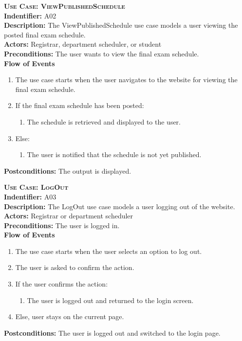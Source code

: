 \documentclass[11pt]{article}
\newcounter{id}
\newenvironment{usecase}{%
	\def\title##1{ {\large \bfseries  \scshape {Use Case:} ##1} \\ }
 	\def\id##1{{\bf Indentifier:} ##1\\}
	\def\des##1{ {\bf Description:} ##1\\}
	\def\actors##1{ {\bf Actors:} ##1\\}
    	\def\pre##1{ {\bf Preconditions:} ##1 \\} %
    	\def\flow##1{ {\bf Flow of Events} ##1}%
    	\newenvironment{ucenum}{%
        	\begin{enumerate}[nolistsep]\small}%
        	{\end{enumerate}}
	\def\post##1{ {\bf Postconditions:} ##1 \\}
}{\vspace{.05in}}
\begin{document}
\begin{usecase}
  \title{ViewPublishedSchedule}
  \id{A02}
  \des{The ViewPublishedSchedule use case models a user viewing the posted final exam schedule.}
  \actors{Registrar, department scheduler, or student}
  \pre{The user wants to view the final exam schedule.}
  \flow{}
  \begin{ucenum}
  \item The use case starts when the user navigates to the website for viewing the final exam schedule.
  \item If the final exam schedule has been posted:
    \begin{ucenum} \item The schedule is retrieved and displayed to the user. \end{ucenum}
  \item Else:
    \begin{ucenum} \item The user is notified that the schedule is not yet published. \end{ucenum}
  \end{ucenum}
  \post{The output is displayed.}
\end{usecase}

\begin{usecase}
  \title{LogOut}
  \id{A03}
  \des{The LogOut use case models a user logging out of the website.}
  \actors{Registrar or department scheduler}
  \pre{The user is logged in.}
  \flow{}
  \begin{ucenum}
  \item The use case starts when the user selects an option to log out.
  \item The user is asked to confirm the action.
  \item If the user confirms the action:
    \begin{ucenum}
    \item The user is logged out and returned to the login screen.
    \end{ucenum}
  \item Else, user stays on the current page.
  \end{ucenum}
  \post{The user is logged out and switched to the login page.}
\end{usecase}
\end{document}
